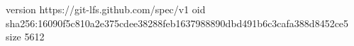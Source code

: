version https://git-lfs.github.com/spec/v1
oid sha256:16090f5c810a2e375cdee38288feb1637988890dbd491b6c3cafa388d8452ce5
size 5612
